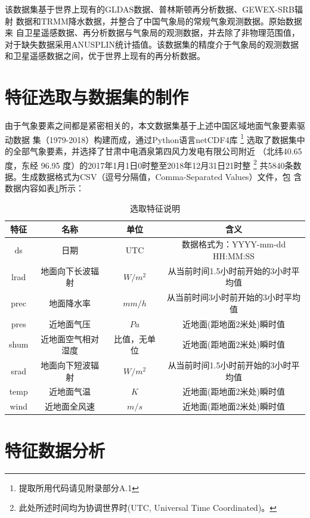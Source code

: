 \documentclass[AutoFakeBold]{LZUThesis}
\begin{document}
该数据集基于世界上现有的GLDAS数据、普林斯顿再分析数据、GEWEX-SRB辐射
数据和TRMM降水数据，并整合了中国气象局的常规气象观测数据。原始数据来
自卫星遥感数据、再分析数据与气象局的观测数据，并去除了非物理范围值，
对于缺失数据采用ANUSPLIN统计插值。该数据集的精度介于气象局的观测数据
和卫星遥感数据之间，优于世界上现有的再分析数据。\cite{6bab74c1-f2dd-4e24-a833-81f33bedf9b1}

\section{特征选取与数据集的制作}
由于气象要素之间都是紧密相关的，本文数据集基于上述中国区域地面气象要素驱动数据
集（1979-2018）构建而成，通过Python语言netCDF4库
\footnote{提取所用代码请见附录部分A.1}
选取了数据集中的全部气象要素，并选择了甘肃中电酒泉第四风力发电有限公司附近
（北纬40.65 度，东经 96.95 度）的2017年1月1日0时整至2018年12月31日21时整
\footnote{此处所述时间均为协调世界时(UTC, Universal Time Coordinated)。}
共5840条数据。生成数据格式为CSV（逗号分隔值，Comma-Separated Values）文件，包
含数据内容如表\ref{features}所示：

\begin{table}[H]
    \centering
    \caption{选取特征说明}
    \begin{tabular}{cccc}
    \toprule
    特征 & 名称 & 单位 & 含义 \\
    \midrule
    ds & 日期 & UTC & 数据格式为：YYYY-mm-dd HH:MM:SS \\
    lrad & 地面向下长波辐射 & $W/m^2$ & 从当前时间1.5小时前开始的3小时平均值 \\
    prec & 地面降水率 & $mm/h$ & 从当前时间3小时前开始的3小时平均值 \\
    pres & 近地面气压 & $Pa$ & 近地面(距地面2米处)瞬时值 \\
    shum & 近地面空气相对湿度 & 比值，无单位 & 近地面(距地面2米处)瞬时值 \\
    srad & 地面向下短波辐射 & $W/m^2$ & 从当前时间1.5小时前开始的3小时平均值 \\
    temp & 近地面气温 & $K$ & 近地面(距地面2米处)瞬时值 \\
    wind & 近地面全风速 & $m/s$ & 近地面(距地面2米处)瞬时值 \\
    \bottomrule
    \end{tabular}
    \label{features}
\end{table}

\section{特征数据分析}
\end{document}

